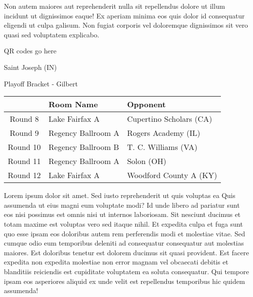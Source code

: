 \documentclass{article}%
\begin{document}
\newline%
Non autem maiores aut reprehenderit nulla sit repellendus dolore ut illum incidunt ut dignissimos eaque! Ex aperiam minima eos quis dolor id consequatur eligendi ut culpa galisum. Non fugiat corporis vel doloremque dignissimos sit vero quasi sed voluptatem explicabo.\newline%
\newline%
%
\vspace*{30pt}%
\begin{center}%
\begin{Huge}%
QR codes go here%
\end{Huge}%
\end{center}%
\newpage%
\begin{center}%
\begin{Huge}%
Saint Joseph (IN)%
\end{Huge}%
\vspace*{8pt}%
\linebreak%
\begin{Large}%
Playoff Bracket {-} Gilbert%
\end{Large}%
\end{center}%
\begin{tabularx}{\textwidth}{|c|Y|Y|}%
\hline%
&Room Name&Opponent\\%
\hline%
Round 8&Lake Fairfax A&Cupertino Scholars (CA)\\%
Round 9&Regency Ballroom A&Rogers Academy (IL)\\%
Round 10&Regency Ballroom B&T. C. Williams (VA)\\%
Round 11&Regency Ballroom A&Solon (OH)\\%
Round 12&Lake Fairfax A&Woodford County A (KY)\\%
\hline%
\end{tabularx}%
\vspace*{8pt}%
\linebreak%
\newline%
\newline%
Lorem ipsum dolor sit amet. Sed iusto reprehenderit ut quis voluptas ea Quis assumenda ut eius magni eum voluptate modi? Id unde libero ad pariatur sunt eos nisi possimus est omnis nisi ut internos laboriosam. Sit nesciunt ducimus et totam maxime est voluptas vero sed itaque nihil. Et expedita culpa et fuga sunt quo esse ipsam eos doloribus autem rem perferendis modi et molestiae vitae.\newline%
\newline%
Sed cumque odio eum temporibus deleniti ad consequatur consequatur aut molestias maiores. Est doloribus tenetur est dolorem ducimus sit quasi provident. Est facere expedita non expedita molestiae non error magnam vel obcaecati debitis et blanditiis reiciendis est cupiditate voluptatem ea soluta consequatur. Qui tempore ipsam eos asperiores aliquid ex unde velit est repellendus temporibus hic quidem assumenda!\newline%
\end{document}
